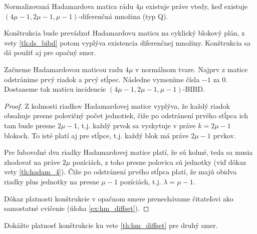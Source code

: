 \begin{theorem}
\label{th:hm_diffset}
Normalizovaná Hadamardova matica rádu $4\mu$ existuje práve vtedy, keď existuje $(4\mu-1, 2\mu-1, \mu-1)$-diferenčná množina (typ Q). 
\end{theorem}
\begin{construction}
Konštrukcia bude prevádzať Hadamardovu maticu na cyklický blokový plán, z vety \ref{th:ds_bibd} potom vyplýva existencia diferenčnej množiny. Konštrukcia sa dá použiť aj pre opačný smer.

Začneme Hadamardovou maticou radu $4\mu$ v normálnom tvare. 
Najprv z matice odstránime prvý riadok a prvý stĺpec.
Následne vymeníme čísla $-1$ za $0$.
Dostaneme tak maticu incidencie $(4\mu - 1, 2\mu - 1, \mu -1)$-BIBD.
\end{construction}
\begin{proof}
Z kolmosti riadkov Hadamardovej matice vyplýva, že každý riadok obsahuje presne polovičný počet jednotiek, čiže po odstránení prvého stĺpca ich tam bude presne $2\mu - 1$, t.j. každý prvok sa vyskytuje v práve $k = 2\mu - 1$ blokoch. To isté platí aj pre stĺpce, t.j. každý blok má práve $2\mu - 1$ prvkov.

Pre ľubovoľné dva riadky Hadamardovej matice platí, že sú kolmé, teda sa musia zhodovať na práve $2\mu$ pozíciách, z toho presne polovica sú jednotky (viď dôkaz vety \ref{th:hadam_4}). Čiže po odstránení prvého stĺpca platí, že majú obidva riadky plus jednotky na presne $\mu - 1$ pozíciách, t.j. $\lambda = \mu - 1$.

Dôkaz platnosti konštrukcie v opačnom smere prenechávame čitateľovi ako samostatné cvičenie (úloha \ref{ex:hm_diffset}).
\end{proof}

\begin{exercise}
\label{ex:hm_diffset}
Dokážte platnosť konštrukcie ku vete \ref{th:hm_diffset} pre druhý smer. 
\end{exercise}

